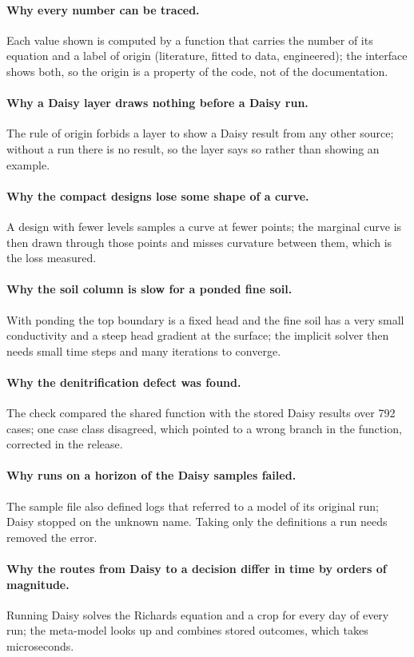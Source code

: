 \paragraph{Why every number can be traced.} Each value shown is computed by a function that carries the number of its equation and a label of origin (literature, fitted to data, engineered); the interface shows both, so the origin is a property of the code, not of the documentation.
\paragraph{Why a Daisy layer draws nothing before a Daisy run.} The rule of origin forbids a layer to show a Daisy result from any other source; without a run there is no result, so the layer says so rather than showing an example.
\paragraph{Why the compact designs lose some shape of a curve.} A design with fewer levels samples a curve at fewer points; the marginal curve is then drawn through those points and misses curvature between them, which is the loss measured.
\paragraph{Why the soil column is slow for a ponded fine soil.} With ponding the top boundary is a fixed head and the fine soil has a very small conductivity and a steep head gradient at the surface; the implicit solver then needs small time steps and many iterations to converge.
\paragraph{Why the denitrification defect was found.} The check compared the shared function with the stored Daisy results over 792 cases; one case class disagreed, which pointed to a wrong branch in the function, corrected in the release.
\paragraph{Why runs on a horizon of the Daisy samples failed.} The sample file also defined logs that referred to a model of its original run; Daisy stopped on the unknown name. Taking only the definitions a run needs removed the error.
\paragraph{Why the routes from Daisy to a decision differ in time by orders of magnitude.} Running Daisy solves the Richards equation and a crop for every day of every run; the meta-model looks up and combines stored outcomes, which takes microseconds.

